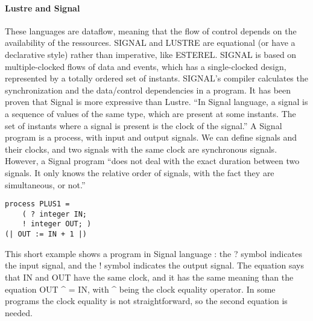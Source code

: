 {{{{\paragraph{Lustre and Signal} 
These languages are dataflow, meaning that the flow of control depends on the availability of the ressources. SIGNAL and LUSTRE are equational (or have a declarative style) rather than imperative, like ESTEREL. SIGNAL is based on multiple-clocked flows of data and events, which has a  single-clocked design, represented by a totally ordered set of instants. SIGNAL’s compiler calculates the synchronization and the data/control dependencies in a program. It has been proven that Signal is more expressive than Lustre.
“In Signal language, a signal is a sequence of values of the same type, which are present at
some instants. The set of instants where a signal is present is the clock of the signal.” \cite{signalTutoring}
A Signal program is a process, with input and output signals. We can define signals and their clocks, and two signals with the same clock are synchronous signals. However, a Signal program “does not deal with the exact duration between two signals. It only knows the relative order of signals, with the fact they are simultaneous, or not.”\cite{signalTutoring}

\begin{tcolorbox}[
        boxrule=0pt,
        sharp corners]
    \begin{verbatim}
process PLUS1 =
    ( ? integer IN;
    ! integer OUT; )
(| OUT := IN + 1 |)
    \end{verbatim}
\end{tcolorbox}

This short example shows a program in Signal language : the ? symbol indicates the input signal, and the ! symbol indicates the output signal. The equation says that IN and OUT have the same clock, and it has the same meaning than the equation OUT
 \string ^ = IN, with \string ^ being the clock equality operator. In some programs the clock equality is not straightforward, so the second equation is needed.

\smallskip
{}}}}}

